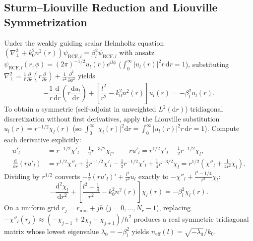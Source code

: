 \documentclass[10pt,letterpaper]{article}
\newcommand{\abs}[1]{\lvert #1 \rvert}
\newcommand{\dd}{\mathrm{d}}
\numberwithin{equation}{section}
\begin{document}
\subsection{Sturm--Liouville Reduction and Liouville Symmetrization}
Under the weakly guiding scalar Helmholtz equation $(\nabla_\perp^2 + k_0^2 n^2(r))\psi_{\mathrm{RCF},l} = \beta_l^2\psi_{\mathrm{RCF},l}$ with ansatz $\psi_{\mathrm{RCF},l}(r,\phi) = (2\pi)^{-1/2} u_l(r) e^{il\phi}$ ($\int_0^\infty \abs{u_l(r)}^2 r\,\dd r = 1$), substituting $\nabla_\perp^2 = \frac{1}{r}\frac{\partial}{\partial r}(r\frac{\partial}{\partial r}) + \frac{1}{r^2}\frac{\partial^2}{\partial\phi^2}$ yields
\begin{equation}
  -\frac{1}{r}\frac{\dd}{\dd r}\!\left(r\frac{\dd u_l}{\dd r}\right) + \left[\frac{l^2}{r^2} - k_0^2 n^2(r)\right] u_l(r) = -\beta_l^2 u_l(r).
\end{equation}
To obtain a symmetric (self-adjoint in unweighted $L^2(\dd r)$) tridiagonal discretization without first derivatives, apply the Liouville substitution $u_l(r) = r^{-1/2}\chi_l(r)$ (so $\int_0^\infty \abs{\chi_l(r)}^2\dd r = \int_0^\infty \abs{u_l(r)}^2 r\,\dd r = 1$). Compute each derivative explicitly:
\begin{align}
  u'_l &= r^{-1/2}\chi'_l - \frac{1}{2}r^{-3/2}\chi_l, \qquad r u'_l = r^{1/2}\chi'_l - \frac{1}{2}r^{-1/2}\chi_l, \\
  \frac{\dd}{\dd r}(r u'_l) &= r^{1/2}\chi''_l + \frac{1}{2}r^{-1/2}\chi'_l - \frac{1}{2}r^{-1/2}\chi'_l + \frac{1}{4}r^{-3/2}\chi_l = r^{1/2}\left(\chi''_l + \frac{1}{4r^2}\chi_l\right).
\end{align}
Dividing by $r^{1/2}$ converts $-\frac{1}{r}(r u'_l)' + \frac{l^2}{r^2}u_l$ exactly to $-\chi''_l + \frac{l^2 - 1/4}{r^2}\chi_l$:
\begin{equation}
  -\frac{\dd^2\chi_l}{\dd r^2} + \left[\frac{l^2 - \frac{1}{4}}{r^2} - k_0^2 n^2(r)\right]\chi_l(r) = -\beta_l^2 \chi_l(r).
  \label{eq:walk_rcf_sym}
\end{equation}
On a uniform grid $r_j = r_{\min} + j h$ ($j = 0,\dots,N_r-1$), replacing $-\chi''_l(r_j) \approx (-\chi_{j-1} + 2\chi_j - \chi_{j+1})/h^2$ produces a real symmetric tridiagonal matrix whose lowest eigenvalue $\lambda_0 = -\beta_l^2$ yields $n_{\mathrm{eff}}(l) = \sqrt{-\lambda_0}/k_0$.
\end{document}
